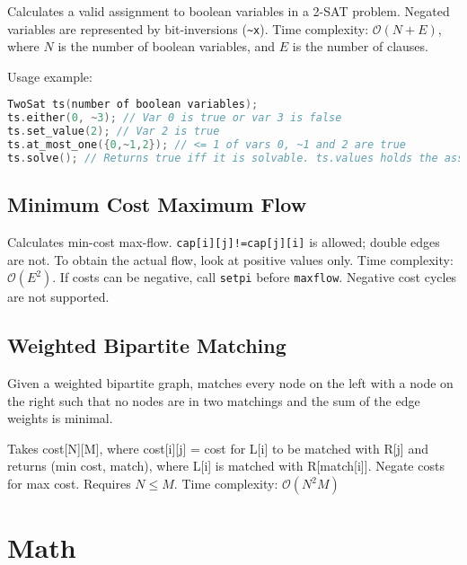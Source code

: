 \documentclass{article}
\begin{document}
Calculates a valid assignment to boolean variables in a 2-SAT problem.
Negated variables are represented by bit-inversions (\lstinline{~x}).
Time complexity: $\mathcal{O}(N+E)$, where $N$ is the number of boolean variables, and $E$ is the number of clauses.



Usage example:
\begin{lstlisting}[language=C++]
TwoSat ts(number of boolean variables);
ts.either(0, ~3); // Var 0 is true or var 3 is false
ts.set_value(2); // Var 2 is true
ts.at_most_one({0,~1,2}); // <= 1 of vars 0, ~1 and 2 are true
ts.solve(); // Returns true iff it is solvable. ts.values holds the assigned values to the variables
\end{lstlisting}

\pagebreak

\subsection*{Minimum Cost Maximum Flow}

Calculates min-cost max-flow. \lstinline{cap[i][j]!=cap[j][i]} is allowed; double edges are not. To obtain the actual flow, look at positive values only. Time complexity: $\mathcal{O}(E^2)$.
If costs can be negative, call \lstinline{setpi} before \lstinline{maxflow}. Negative cost cycles are not supported.



\subsection*{Weighted Bipartite Matching}

Given a weighted bipartite graph, matches every node on the left with a node on the right such that no nodes
are in two matchings and the sum of the edge weights is minimal.

Takes cost[N][M], where cost[i][j] = cost for L[i] to be matched with R[j] and returns (min cost, match), where L[i] is matched with R[match[i]]. Negate costs for max cost. Requires $N \le M$.
Time complexity: $\mathcal{O}(N^2 M)$



\vspace*{2cm}

\section*{Math}
\end{document}
